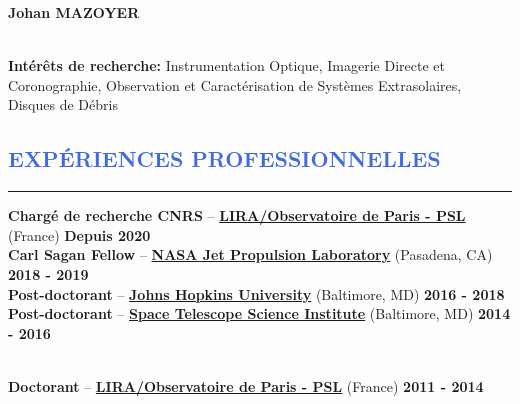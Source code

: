 \documentclass[11pt, a4paper, french]{article}
\begin{document}
\lfoot{\textcolor{Gray}{CV mis à jour en \yeardate\today}}

\begin{huge}
\noindent\textbf{Johan MAZOYER}
\end{huge}\\

\textbf{Intérêts de recherche:} Instrumentation Optique, Imagerie Directe et Coronographie,
Observation et Caractérisation de Systèmes Extrasolaires, Disques de Débris\\





\vspace{-1.1cm}
\textcolor{RoyalBlue}{\section{\large EXPÉRIENCES PROFESSIONNELLES}
\vspace{-0.2cm}\hrule}
\vspace{0.4cm}


\textbf{Chargé de recherche CNRS} --
\href{https://LIRA.obspm.fr/}{\textbf{LIRA/Observatoire de Paris - PSL}} (France)
\hfill     	 { \bf Depuis 2020}\\

\vspace{-0.11cm}
\textbf{Carl Sagan Fellow} --
\href{https://www.jpl.nasa.gov/}{\textbf{NASA Jet Propulsion Laboratory}} (Pasadena, CA)
\hfill      { \bf 2018 - 2019}\\

\vspace{-0.11cm}
\textbf{Post-doctorant} --
\href{http://physics-astronomy.jhu.edu/}{\textbf{Johns Hopkins University}} (Baltimore, MD)
\hfill   	 { \bf 2016 - 2018}\\

\vspace{-0.11cm}
\textbf{Post-doctorant} --
\href{http://www.stsci.edu}{\textbf{Space Telescope Science Institute}} (Baltimore, MD)
\hfill        { \bf 2014 - 2016}\\\

\vspace{-0.11cm}
\textbf{Doctorant} --
\href{https://LIRA.obspm.fr/}{\textbf{LIRA/Observatoire de Paris - PSL}} (France)
\hfill        { \bf 2011 - 2014}\\
\end{document}

